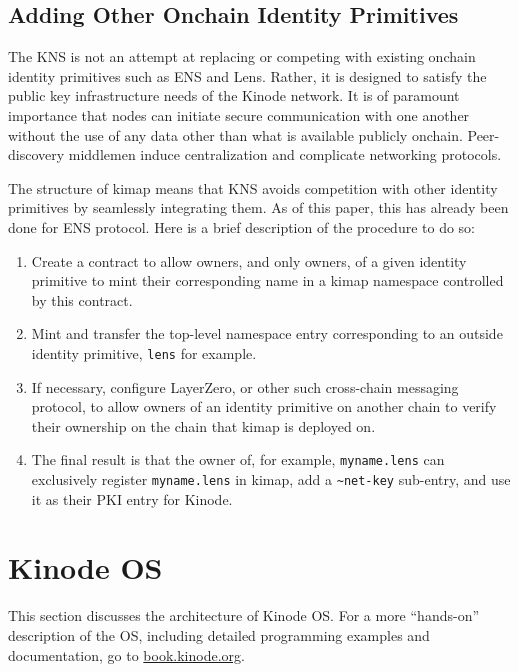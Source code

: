 \documentclass[runningheads]{llncs}
\begin{document}
\subsection{Adding Other Onchain Identity Primitives}
\label{sec:knsotherprimitives}

The KNS is not an attempt at replacing or competing with existing onchain identity primitives such as ENS and Lens.
Rather, it is designed to satisfy the public key infrastructure needs of the Kinode network.
It is of paramount importance that nodes can initiate secure communication with one another without the use of any data other than what is available publicly onchain.
Peer-discovery middlemen induce centralization and complicate networking protocols.

The structure of kimap means that KNS avoids competition with other identity primitives by seamlessly integrating them.
As of this paper, this has already been done for ENS protocol.
Here is a brief description of the procedure to do so:
\begin{enumerate}
    \item Create a contract to allow owners, and only owners, of a given identity primitive to mint their corresponding name in a kimap namespace controlled by this contract.
    \item Mint and transfer the top-level namespace entry corresponding to an outside identity primitive, \verb|lens| for example.
    \item If necessary, configure LayerZero, or other such cross-chain messaging protocol, to allow owners of an identity primitive on another chain to verify their ownership on the chain that kimap is deployed on.
    \item The final result is that the owner of, for example, \verb|myname.lens| can exclusively register \verb|myname.lens| in kimap, add a \verb|~net-key| sub-entry, and use it as their PKI entry for Kinode.
\end{enumerate}

\section{Kinode OS}
\label{sec:os}

This section discusses the architecture of Kinode OS.
For a more ``hands-on'' description of the OS, including detailed programming examples and documentation, go to \href{https://book.kinode.org/}{book.kinode.org}.
\end{document}
